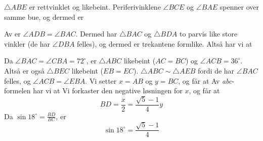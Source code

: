 \newpage

$ \triangle ABE $ er rettvinklet og likebeint. Periferivinklene $ \angle BCE $ og $ \angle BAE $ spenner over samme bue, og dermed er



Av  er $\angle ADB=\angle BAC$. Dermed har $\triangle BAC$ og $\triangle BDA$ to parvis like store vinkler (de har $\angle DBA$ felles), og dermed er trekantene formlike. Altså har vi at

\newpage
{}
Da $ \angle BAC=\angle CBA=72^\circ $, er $ \triangle ABC $ likebeint ($ AC=BC $) og $ \angle ACB= 36^\circ $. Altså er også $ \triangle BEC $ likebeint ($ EB=EC $). $ \triangle ABC \sim \triangle AEB$ fordi de har $ \angle BAC $ felles, og $ \angle ACB=\angle EBA $. Vi setter $ x=AB $ og $ y=BC $, og får at
Av \textit{abc}-formelen har vi at
Vi forkaster den negative løsningen for $ x $, og får at
\[BD=\frac{x}{2}=\frac{\sqrt{5}-1}{4}y  \]
Da $ \sin 18^\circ=\frac{BD}{BC} $, er
\[ \sin 18^\circ = \frac{\sqrt{5}-1}{4} \]





